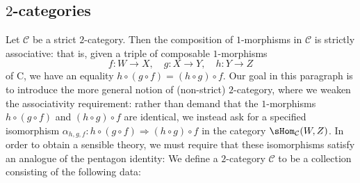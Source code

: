 \subsection{\texorpdfstring{$2$}{2}-categories}
Let $\mathcal{C}$ be a strict $2$-category. Then the composition of $1$-morphisms in $\mathcal{C}$ is strictly associative: that is, given a triple of composable $1$-morphisms
\[f:W\to X,\quad g:X\to Y,\quad h:Y\to Z\]
of C, we have an equality $h\circ(g\circ f)=(h\circ g)\circ f$. Our goal in this paragraph is to introduce the more general notion of (non-strict) $2$-category, where we weaken the associativity requirement: rather than demand that the $1$-morphisms $h\circ(g\circ f)$ and $(h\circ g)\circ f$ are identical, we instead ask for a specified isomorphism $\alpha_{h,g,f}:h\circ(g\circ f)\Rightarrow(h\circ g)\circ f$ in the category $\sHom_{\mathcal{C}}(W,Z)$. In order to obtain a sensible theory, we must require that these isomorphisms satisfy an analogue of the pentagon identity: We define a $2$-category $\mathcal{C}$ to be a collection consisting of the following data:
